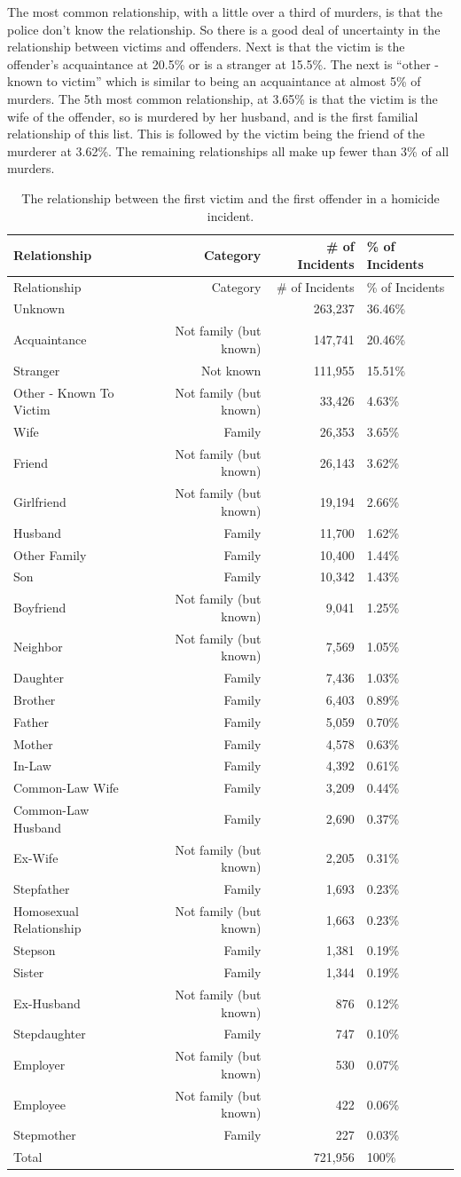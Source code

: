 \documentclass[
  12pt,
  openany]{book}
\begin{document}
The most common relationship, with a little over a third of murders, is that the police don't know the relationship. So there is a good deal of uncertainty in the relationship between victims and offenders. Next is that the victim is the offender's acquaintance at 20.5\% or is a stranger at 15.5\%. The next is ``other - known to victim'' which is similar to being an acquaintance at almost 5\% of murders. The 5th most common relationship, at 3.65\% is that the victim is the wife of the offender, so is murdered by her husband, and is the first familial relationship of this list. This is followed by the victim being the friend of the murderer at 3.62\%. The remaining relationships all make up fewer than 3\% of all murders.

\begin{longtable}[]{@{}lrrl@{}}
\caption{\label{tab:shrRelationship}The relationship between the first victim and the first offender in a homicide incident.}\tabularnewline
\toprule
Relationship & Category & \# of Incidents & \% of Incidents\tabularnewline
\midrule
\endfirsthead
\toprule
Relationship & Category & \# of Incidents & \% of Incidents\tabularnewline
\midrule
\endhead
Unknown & & 263,237 & 36.46\%\tabularnewline
Acquaintance & Not family (but known) & 147,741 & 20.46\%\tabularnewline
Stranger & Not known & 111,955 & 15.51\%\tabularnewline
Other - Known To Victim & Not family (but known) & 33,426 & 4.63\%\tabularnewline
Wife & Family & 26,353 & 3.65\%\tabularnewline
Friend & Not family (but known) & 26,143 & 3.62\%\tabularnewline
Girlfriend & Not family (but known) & 19,194 & 2.66\%\tabularnewline
Husband & Family & 11,700 & 1.62\%\tabularnewline
Other Family & Family & 10,400 & 1.44\%\tabularnewline
Son & Family & 10,342 & 1.43\%\tabularnewline
Boyfriend & Not family (but known) & 9,041 & 1.25\%\tabularnewline
Neighbor & Not family (but known) & 7,569 & 1.05\%\tabularnewline
Daughter & Family & 7,436 & 1.03\%\tabularnewline
Brother & Family & 6,403 & 0.89\%\tabularnewline
Father & Family & 5,059 & 0.70\%\tabularnewline
Mother & Family & 4,578 & 0.63\%\tabularnewline
In-Law & Family & 4,392 & 0.61\%\tabularnewline
Common-Law Wife & Family & 3,209 & 0.44\%\tabularnewline
Common-Law Husband & Family & 2,690 & 0.37\%\tabularnewline
Ex-Wife & Not family (but known) & 2,205 & 0.31\%\tabularnewline
Stepfather & Family & 1,693 & 0.23\%\tabularnewline
Homosexual Relationship & Not family (but known) & 1,663 & 0.23\%\tabularnewline
Stepson & Family & 1,381 & 0.19\%\tabularnewline
Sister & Family & 1,344 & 0.19\%\tabularnewline
Ex-Husband & Not family (but known) & 876 & 0.12\%\tabularnewline
Stepdaughter & Family & 747 & 0.10\%\tabularnewline
Employer & Not family (but known) & 530 & 0.07\%\tabularnewline
Employee & Not family (but known) & 422 & 0.06\%\tabularnewline
Stepmother & Family & 227 & 0.03\%\tabularnewline
Total & & 721,956 & 100\%\tabularnewline
\bottomrule
\end{longtable}
\end{document}
